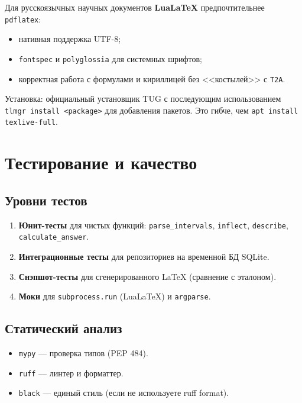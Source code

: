 \documentclass[12pt,a4paper]{article}
\newcommand{\code}[1]{\texttt{#1}}
\begin{document}
Для русскоязычных научных документов \textbf{LuaLaTeX} предпочтительнее
\code{pdflatex}:
\begin{itemize}
    \item нативная поддержка UTF-8;
    \item \code{fontspec} и \code{polyglossia} для системных шрифтов;
    \item корректная работа с формулами и кириллицей без
          <<костылей>> с \code{T2A}.
\end{itemize}

\noindent
Установка: официальный установщик TUG с последующим использованием
\code{tlmgr install <package>} для добавления пакетов. Это
гибче, чем \code{apt install texlive-full}.

\section{Тестирование и качество}

\subsection{Уровни тестов}

\begin{enumerate}
    \item \textbf{Юнит-тесты} для чистых функций:
          \code{parse_intervals}, \code{inflect}, \code{describe},
          \code{calculate\_answer}.
    \item \textbf{Интеграционные тесты} для репозиториев на
          временной БД SQLite.
    \item \textbf{Снэпшот-тесты} для сгенерированного LaTeX
          (сравнение с эталоном).
    \item \textbf{Моки} для \code{subprocess.run} (LuaLaTeX)
          и \code{argparse}.
\end{enumerate}

\subsection{Статический анализ}

\begin{itemize}
    \item \code{mypy} --- проверка типов (PEP 484).
    \item \code{ruff} --- линтер и форматтер.
    \item \code{black} --- единый стиль (если не используете ruff format).
\end{itemize}
\end{document}
